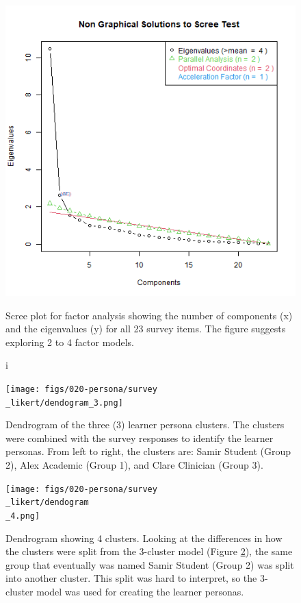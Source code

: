 \documentclass[020-persona\_validation.tex]{subfiles}
\begin{document}
    \begin{figure}[!hbtp]
        \centering
        \includegraphics[scale=0.5]{figs/010-validation/efa_eigen_scree.png}
        \caption[Scree plot for factor analysis]i
        {Scree plot for factor analysis showing the number of components (x) and the eigenvalues (y) for all 23 survey items.
            The figure suggests exploring 2 to 4 factor models.
        }
        \label{fig:scree-fa-all}
    \end{figure}

    \begin{figure}[!hbtp]
        \centering
        \texttt{[image: figs/020-persona/survey\\\_likert/dendogram\_3.png]}
        \caption[Dendrogram of the 3 learner persona clusters]
        {Dendrogram of the three (3) learner persona clusters.
        The clusters were combined with the survey responses to identify the learner personas.
        From left to right, the clusters are: Samir Student (Group 2), Alex Academic (Group 1),
        and Clare Clinician (Group 3).
        }
        \label{sfig:dendro-cluster-3}
    \end{figure}

    \begin{figure}[!hbtp]
        \centering
        \texttt{[image: figs/020-persona/survey\\\_likert/dendogram\\\_4.png]}
        \caption[4 cluster Dendrogram.]
        {Dendrogram showing 4 clusters. Looking at the differences in how the clusters were split from the 3-cluster model
        (Figure \ref{sfig:dendro-cluster-3}),
        the same group that eventually was named Samir Student (Group 2) was split into another cluster.
        This split was hard to interpret, so the 3-cluster model was used for creating the learner personas.
        }
        \label{sfig:dendro-4}
    \end{figure}
\end{document}
